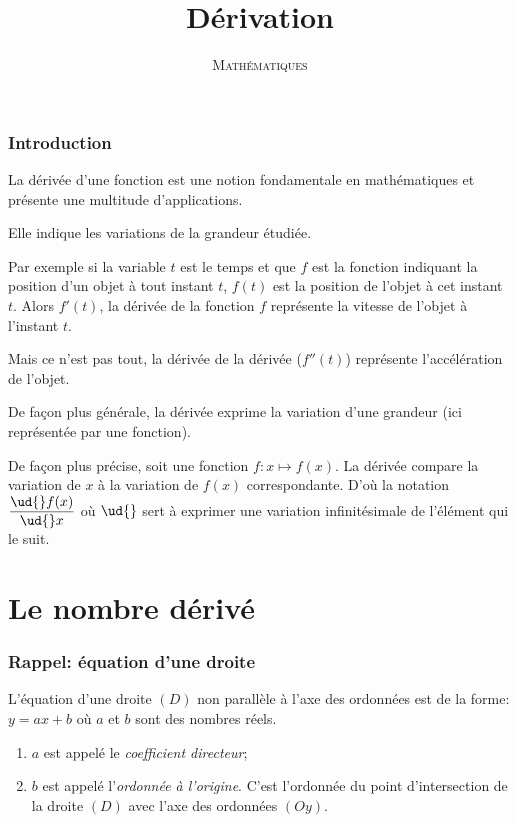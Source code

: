 \documentclass[a4paper,12pt]{scrartcl}
\date{}
\title{Dérivation}
\author{\textsc{Mathématiques}}
\begin{document}

\maketitle

\tableofcontents

\section*{Introduction}

La dérivée d'une fonction est une notion fondamentale en mathématiques et présente une multitude d'applications. 

Elle indique les variations de la grandeur étudiée.

Par exemple si la variable $t$ est le temps et que $f$ est la fonction indiquant la position d'un objet à tout instant $t$, $f(t)$ est la position de l'objet à cet instant $t$. Alors $f'(t)$, la dérivée de la fonction $f$ représente la vitesse de l'objet à l'instant $t$. 

Mais ce n'est pas tout, la dérivée de la dérivée ($f''(t)$) représente l'accélération de l'objet.

De façon plus générale, la dérivée exprime la variation d'une grandeur (ici représentée par une fonction).

De façon plus précise, soit une fonction $f:x \longmapsto f(x)$. La dérivée compare la variation de $x$ à la variation de $f(x)$ correspondante. D'où la notation $\dfrac{\ud{} f(x)}{\ud{} x}$ où $\ud{}$ sert à exprimer une variation infinitésimale de l'élément qui le suit.

\part{Le nombre dérivé} 

\section{Rappel: équation d'une droite} 

L'équation d'une droite $(D)$ non parallèle à l'axe des ordonnées est de la forme: $y = ax+b$ où $a$ et $b$ sont des nombres réels.

\begin{enumerate}
 \item $a$ est appelé le \emph{coefficient directeur}; 
 \item $b$ est appelé l'\emph{ordonnée à l'origine}. C'est l'ordonnée du point d'intersection de la droite $(D)$ avec l'axe des ordonnées $(Oy)$.
\end{enumerate}
\end{document}

